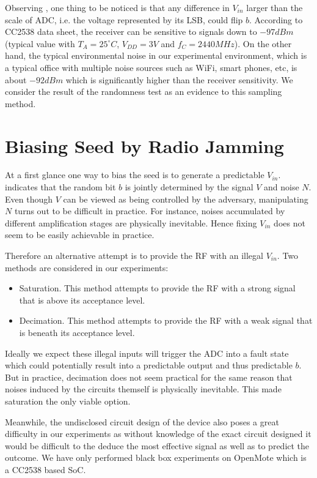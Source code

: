 Observing , one thing to be noticed is that any difference in $V_{in}$ larger than the scale of ADC, i.e. the voltage represented by its LSB, could flip $b$. According to CC2538 data sheet\cite{CC2538Datasheet}, the receiver can be sensitive to signals down to $-97dBm$ (typical value with $T_A = 25^{\circ}C$, $V_{DD} = 3V$ and $f_{C} = 2440MHz$). On the other hand, the typical environmental noise in our experimental environment, which is a typical office with multiple noise sources such as  WiFi, smart phones, etc, is about $-92dBm$ which is significantly higher than the receiver sensitivity. We consider the result of the randomness test as an evidence to this sampling method.

\section{Biasing Seed by Radio Jamming}
At a first glance one way to bias the seed is to generate a predictable $V_{in}$.  indicates that the random bit $b$ is jointly determined by the signal $V$ and noise $N$. Even though $V$ can be viewed as being controlled by the adversary, manipulating $N$ turns out to be difficult in practice. For instance, noises accumulated by different amplification stages are physically inevitable. Hence fixing $V_{in}$ does not seem to be easily achievable in practice.

Therefore an alternative attempt is to provide the RF with an illegal $V_{in}$. Two methods are considered in our experiments:
\begin{itemize}
	\item Saturation. This method attempts to provide the RF with a strong signal that is above its acceptance level.
	\item Decimation. This method attempts to provide the RF with a weak signal that is beneath its acceptance level.
\end{itemize}

Ideally we expect these illegal inputs will trigger the ADC into a fault state which could potentially result into a predictable output and thus predictable $b$. But in practice, decimation does not seem practical for the same reason that noises induced by the circuits themself is physically inevitable. This made saturation the only viable option.

Meanwhile, the undisclosed circuit design of the device also poses a great difficulty in our experiments as without knowledge of the exact circuit designed it would be difficult to the deduce the most effective signal as well as to predict the outcome. We have only performed black box experiments on OpenMote\cite{OpenMote} which is a CC2538 based SoC.

